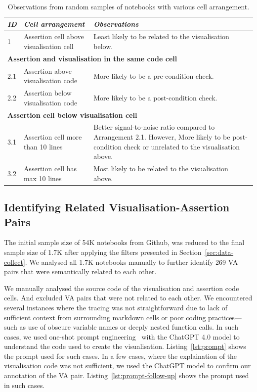\documentclass[conference]{IEEEtran}
\begin{document}
\begin{table}
  \centering
  \caption{Observations from random samples of notebooks with various
  cell arrangement.}
  \begin{tabular}{@{}l p{} p{}@{}}
    \toprule
    \emph{\textbf{ID}}&
    \emph{\textbf{Cell arrangement}} &
    \emph{\textbf{Observations}}\\
    \midrule
    1 &
    Assertion cell above visualisation cell &
    Least likely to be related to the visualisation below.\\
    \midrule
    \multicolumn{3}{l}{\textbf{Assertion and visualisation in the same code cell}}\\
    \midrule
    2.1 &
    Assertion above visualisation code &
    More likely to be a pre-condition check.\\
    2.2 &
    Assertion below visualisation code &
    More likely to be a post-condition check.\\
    \midrule
    \multicolumn{3}{l}{\textbf{Assertion cell below visualisation cell}}\\
    \midrule
    3.1 &
    Assertion cell more than 10 lines &
    Better signal-to-noise ratio compared to Arrangement 2.1. However, More likely to be post-condition check or unrelated to the visualisation above.\\
    3.2 &
    Assertion cell has max 10 lines &
    Most likely to be related to the visualisation above.\\
    \bottomrule
  \end{tabular}
  \label{tab:cell-arrangement}
\end{table}

\subsection{Identifying Related Visualisation-Assertion Pairs}\label{sec:identify-related-pairs}

The initial sample size of 54K notebooks from Github, was reduced to the final sample size of 1.7K after applying the filters presented in Section~\ref{sec:data-collect}. We analysed all 1.7K notebooks manually to further identify 269 VA pairs that were semantically related to each other.

We manually analysed the source code of the visualisation and assertion code cells. And excluded VA pairs that were not related to each other. We encountered several instances where the tracing was not straightforward due to lack of sufficient context from surrounding markdown cells or poor coding practices---such as use of obscure variable names or deeply nested function calls. In such cases, we used one-shot prompt engineering~\cite{liu2023pretrain} with the ChatGPT 4.0 model to understand the code used to create the visualisation. Listing~\ref{lst:prompt} shows the prompt used for such cases. In a few cases, where the explaination of the visualisation code was not sufficient, we used the ChatGPT model to confirm our annotation of the VA pair. Listing~\ref{lst:prompt-follow-up} shows the prompt used in such cases.
\end{document}

